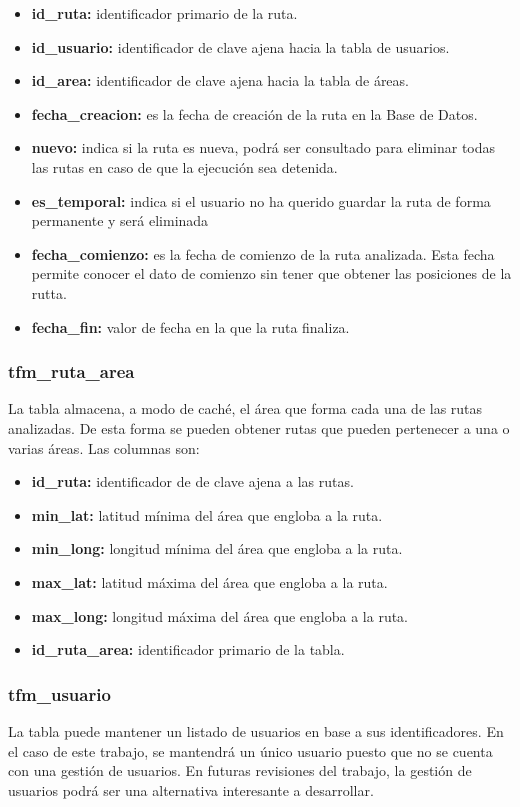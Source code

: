 \begin{itemize}
	\item \textbf{id\_ruta:} identificador primario de la ruta.
	\item \textbf{id\_usuario:} identificador de clave ajena hacia la tabla de usuarios.
	\item \textbf{id\_area:} identificador de clave ajena hacia la tabla de áreas.
	\item \textbf{fecha\_creacion:} es la fecha de creación de la ruta en la Base de Datos.
	\item \textbf{nuevo:} indica si la ruta es nueva, podrá ser consultado para eliminar todas las rutas en caso de que la ejecución sea detenida.
	\item \textbf{es\_temporal:} indica si el usuario no ha querido guardar la ruta de forma permanente  y será eliminada
	\item \textbf{fecha\_comienzo:} es la fecha de comienzo de la ruta analizada. Esta fecha permite conocer el dato  de comienzo sin tener que obtener las posiciones de la rutta.
	\item \textbf{fecha\_fin:} valor de fecha en la que la ruta finaliza.
\end{itemize}

\subsubsection{tfm\_ruta\_area}
La tabla  almacena, a modo de caché, el área que forma cada una de las rutas analizadas. De esta forma se pueden obtener rutas que pueden pertenecer a una o varias áreas. Las columnas son:

\begin{itemize}
	\item \textbf{id\_ruta:} identificador de de clave ajena a las rutas.
	\item \textbf{min\_lat:} latitud mínima del área que engloba a la ruta.
	\item \textbf{min\_long:} longitud mínima del área que engloba a la ruta.
	\item \textbf{max\_lat:} latitud máxima del área que engloba a la ruta.
	\item \textbf{max\_long:} longitud máxima del área que engloba a la ruta.
	\item \textbf{id\_ruta\_area:} identificador primario de la tabla.
\end{itemize}

\subsubsection{tfm\_usuario}
La tabla  puede mantener un listado de usuarios en base a sus identificadores. En el caso de este trabajo, se mantendrá un único usuario puesto que no se cuenta con una gestión de usuarios. En futuras revisiones del trabajo, la gestión de usuarios podrá ser una alternativa interesante a desarrollar.

